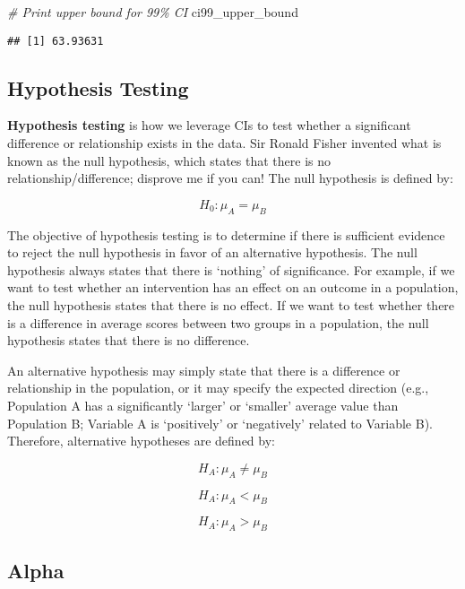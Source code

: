\documentclass[
]{book}
\newenvironment{Shaded}{\begin{snugshade}}{\end{snugshade}}
\newcommand{\CommentTok}[1]{\textcolor[rgb]{0.56,0.35,0.01}{\textit{#1}}}
\newcommand{\NormalTok}[1]{#1}
\begin{document}
\begin{Shaded}
\begin{Highlighting}[]
\CommentTok{\# Print upper bound for 99\% CI}
\NormalTok{ci99\_upper\_bound}
\end{Highlighting}
\end{Shaded}

\begin{verbatim}
## [1] 63.93631
\end{verbatim}

\hypertarget{hypothesis-testing}{%
\subsection{Hypothesis Testing}\label{hypothesis-testing}}

\textbf{Hypothesis testing} is how we leverage CIs to test whether a significant difference or relationship exists in the data. Sir Ronald Fisher invented what is known as the null hypothesis, which states that there is no relationship/difference; disprove me if you can! The null hypothesis is defined by:

\[ H_0: \mu_A = \mu_B \]

The objective of hypothesis testing is to determine if there is sufficient evidence to reject the null hypothesis in favor of an alternative hypothesis. The null hypothesis always states that there is `nothing' of significance. For example, if we want to test whether an intervention has an effect on an outcome in a population, the null hypothesis states that there is no effect. If we want to test whether there is a difference in average scores between two groups in a population, the null hypothesis states that there is no difference.

An alternative hypothesis may simply state that there is a difference or relationship in the population, or it may specify the expected direction (e.g., Population A has a significantly `larger' or `smaller' average value than Population B; Variable A is `positively' or `negatively' related to Variable B). Therefore, alternative hypotheses are defined by:

\[ H_A: \mu_A \neq \mu_B \]

\[ H_A: \mu_A < \mu_B \]

\[ H_A: \mu_A > \mu_B \]

\hypertarget{alpha}{%
\subsection{Alpha}\label{alpha}}
\end{document}
